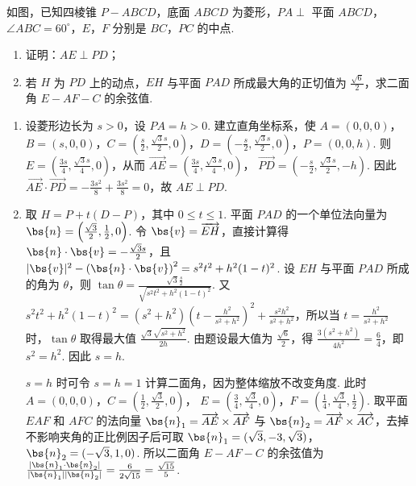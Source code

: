 \begin{problem}
如图，已知四棱锥 \(P - ABCD\)，底面 \(ABCD\) 为菱形，\(PA \perp\) 平面 \(ABCD\)，\(\angle ABC = 60^{\circ}\)，\(E\)，\(F\) 分别是 \(BC\)，\(PC\) 的中点.
\begin{enumerate}
\item 证明：\(AE \perp PD\)；
\item 若 \(H\) 为 \(PD\) 上的动点，\(EH\) 与平面 \(PAD\) 所成最大角的正切值为 \(\frac{\sqrt{6}}{2}\)，求二面角 \(E - AF - C\) 的余弦值.
\end{enumerate}

\end{problem}

\begin{solution}
\begin{enumerate}
\item 设菱形边长为 \(s>0\)，设 \(PA=h>0\). 建立直角坐标系，使
\(A=(0,0,0)\)，\(B=(s,0,0)\)，\(C=\left(\frac{s}{2},\frac{\sqrt3s}{2},0\right)\)，\(D=\left(-\frac{s}{2},\frac{\sqrt3s}{2},0\right)\)，\(P=(0,0,h)\). 则
\(E=\left(\frac{3s}{4},\frac{\sqrt3s}{4},0\right)\)，从而
\(\overrightarrow{AE}=\left(\frac{3s}{4},\frac{\sqrt3s}{4},0\right)\)，
\(\overrightarrow{PD}=\left(-\frac{s}{2},\frac{\sqrt3s}{2},-h\right)\). 因此
\(\overrightarrow{AE}\cdot\overrightarrow{PD}=-\frac{3s^2}{8}+\frac{3s^2}{8}=0\)，故 \(AE\perp PD\).

\item 取 \(H=P+t(D-P)\)，其中 \(0\leqslant t\leqslant1\). 平面 \(PAD\) 的一个单位法向量为 \(\bs{n}=\left(\frac{\sqrt3}{2},\frac12,0\right)\). 令 \(\bs{v}=\overrightarrow{EH}\)，直接计算得
\(\bs{n}\cdot\bs{v}=-\frac{\sqrt3s}{2}\)，且
\(\lvert\bs{v}\rvert^2-\left(\bs{n}\cdot\bs{v}\right)^2=s^2t^2+h^2(1-t)^2\). 设 \(EH\) 与平面 \(PAD\) 所成的角为 \(\theta\)，则
\(\tan\theta=\frac{\sqrt3\frac{s}{2}}{\sqrt{s^2t^2+h^2(1-t)^2}}\). 又
\(s^2t^2+h^2(1-t)^2=(s^2+h^2)\left(t-\frac{h^2}{s^2+h^2}\right)^2+\frac{s^2h^2}{s^2+h^2}\)，所以当 \(t=\frac{h^2}{s^2+h^2}\) 时，\(\tan\theta\) 取得最大值
\(\frac{\sqrt3\sqrt{s^2+h^2}}{2h}\). 由题设最大值为 \(\frac{\sqrt6}{2}\)，得
\(\frac{3(s^2+h^2)}{4h^2}=\frac64\)，即 \(s^2=h^2\). 因此 \(s=h\).

\(s=h\) 时可令 \(s=h=1\) 计算二面角，因为整体缩放不改变角度. 此时
\(A=(0,0,0)\)，\(C=\left(\frac12,\frac{\sqrt3}{2},0\right)\)，
\(E=\left(\frac34,\frac{\sqrt3}{4},0\right)\)，\(F=\left(\frac14,\frac{\sqrt3}{4},\frac12\right)\). 取平面 \(EAF\) 和 \(AFC\) 的法向量
\(\bs{n}_1=\overrightarrow{AE}\times\overrightarrow{AF}\) 与 \(\bs{n}_2=\overrightarrow{AF}\times\overrightarrow{AC}\)，去掉不影响夹角的正比例因子后可取
\(\bs{n}_1=(\sqrt3,-3,\sqrt3)\)，\(\bs{n}_2=(-\sqrt3,1,0)\). 所以二面角 \(E-AF-C\) 的余弦值为
\(\frac{|\bs{n}_1\cdot\bs{n}_2|}{|\bs{n}_1||\bs{n}_2|}=\frac6{2\sqrt{15}}=\frac{\sqrt{15}}5\).
\end{enumerate}
\end{solution}

